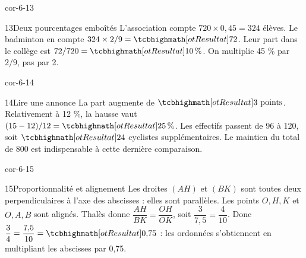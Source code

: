 \begin{blocLivre}{cor-6-13}\begin{corrige}{13}{Deux pourcentages emboîtés}
L’association compte $720\times0{,}45=324$ élèves. Le badminton en compte $324\times2/9=\res{72}$. Leur part dans le collège est $72/720=\res{10\,\%}$. On multiplie 45 \% par $2/9$, pas par 2.
\end{corrige}\end{blocLivre}
\begin{blocLivre}{cor-6-14}\begin{corrige}{14}{Lire une annonce}
La part augmente de $\res{3\text{ points}}$. Relativement à 12 \%, la hausse vaut $(15-12)/12=\res{25\,\%}$. Les effectifs passent de 96 à 120, soit $\res{24}$ cyclistes supplémentaires. Le maintien du total de 800 est indispensable à cette dernière comparaison.
\end{corrige}\end{blocLivre}
\begin{blocLivre}{cor-6-15}\begin{corrige}{15}{Proportionnalité et alignement}
Les droites $(AH)$ et $(BK)$ sont toutes deux perpendiculaires à l’axe des abscisses : elles sont parallèles. Les points $O,H,K$ et $O,A,B$ sont alignés. Thalès donne $\dfrac{AH}{BK}=\dfrac{OH}{OK}$, soit $\dfrac{3}{7{,}5}=\dfrac{4}{10}$. Donc $\dfrac34=\dfrac{7{,}5}{10}=\res{0{,}75}$ : les ordonnées s’obtiennent en multipliant les abscisses par 0,75.
\label{fig-cor-6-15}
\end{corrige}\end{blocLivre}
